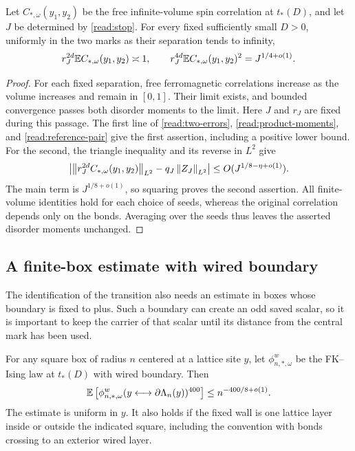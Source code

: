 \begin{proposition}
\label{read:moments}
Let $C_{*,\omega}(y_1,y_2)$ be the free infinite-volume spin correlation
at $t_*(D)$, and let $J$ be determined by \eqref{read:stop}.  For every
fixed sufficiently small $D>0$, uniformly in the two marks as their
separation tends to infinity,
\begin{equation}
 r_J^{2d}\mathbb E C_{*,\omega}(y_1,y_2)\asymp1,
 \qquad
 r_J^{4d}\mathbb E C_{*,\omega}(y_1,y_2)^2
       =J^{1/4+o(1)}.
 \label{read:moment-conclusion}
\end{equation}
\end{proposition}

\begin{proof}
For each fixed separation, free ferromagnetic correlations increase
as the volume increases and remain in $[0,1]$.  Their limit exists,
and bounded convergence passes both disorder moments to the limit.
Here $J$ and $r_J$ are fixed during this passage.  The first line of
\eqref{read:two-errors}, \eqref{read:product-moments}, and
\eqref{read:reference-pair} give the first assertion, including a
positive lower bound.  For the second, the triangle inequality and
its reverse in $L^2$ give
\[
 \left|\left\lVert r_J^{2d}C_{*,\omega}(y_1,y_2)\right\rVert_{L^2}
             -q_J\left\lVert Z_J\right\rVert_{L^2}\right|
 \le O(J^{1/8-\eta+o(1)}).
\]
The main term is $J^{1/8+o(1)}$, so squaring proves the second
assertion.  All finite-volume identities hold for each choice of
seeds, whereas the original correlation depends only on the bonds.
Averaging over the seeds thus leaves the asserted disorder moments
unchanged.
\end{proof}

\subsection{A finite-box estimate with wired boundary}

The identification of the transition also needs an estimate in boxes
whose boundary is fixed to plus.  Such a boundary can create an odd
saved scalar, so it is important to keep the carrier of that scalar
until its distance from the central mark has been used.

\begin{proposition}
\label{read:arm}
For any square box of radius $n$ centered at a lattice site $y$, let
$\phi^w_{n,*,\omega}$ be the FK--Ising law at $t_*(D)$ with wired
boundary.  Then
\begin{equation}
 \mathbb E\left[\phi^w_{n,*,\omega}
    (y\longleftrightarrow\partial\Lambda_n(y))^{400}\right]
       \le n^{-400/8+o(1)}.
 \label{read:arm-bound}
\end{equation}
The estimate is uniform in $y$.  It also holds if the fixed wall is
one lattice layer inside or outside the indicated square, including
the convention with bonds crossing to an exterior wired layer.
\end{proposition}

